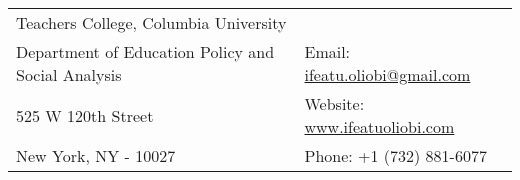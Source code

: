 \documentclass[letterpaper, 11pt]{article}
\begin{document}


\begin{center}
\begin{tabular}{l l}
 Teachers College, Columbia University    &  \\
Department of Education Policy and Social Analysis    &  \hspace{1in} Email: \href{mailto:ifeatu.oliobi@gmail.com}{ifeatu.oliobi@gmail.com}  \\
 525 W 120th Street             &  \hspace{1in}  Website: \href{www.ifeatuoliobi.com}{www.ifeatuoliobi.com} \\
 New York, NY - 10027 & \hspace{1.4in} Phone: +1 (732) 881-6077 \\
\end{tabular}
\end{center}

\vspace{1em}


\setlength{\tabcolsep}{8pt}
\end{document}
